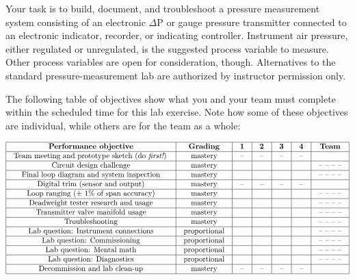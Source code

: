 \documentclass[12pt,a4paper]{article}
\begin{document}
\begin{itemize}
\vskip 5pt

Your task is to build, document, and troubleshoot a pressure measurement system consisting of an electronic $\Delta$P or gauge pressure transmitter connected to an electronic indicator, recorder, or indicating controller.  Instrument air pressure, either regulated or unregulated, is the suggested process variable to measure.  Other process variables are open for consideration, though.  Alternatives to the standard pressure-measurement lab are authorized by instructor permission only.

The following table of objectives show what you and your team must complete within the scheduled time for this lab exercise.  Note how some of these objectives are individual, while others are for the team as a whole:



$$\vbox{\offinterlineskip
\halign{\strut
\vrule \quad\hfil # \ \hfil & 
\vrule \quad\hfil # \ \hfil & 
\vrule \quad\hfil # \ \hfil & 
\vrule \quad\hfil # \ \hfil & 
\vrule \quad\hfil # \ \hfil & 
\vrule \quad\hfil # \ \hfil & 
\vrule \quad\hfil # \ \hfil \vrule \cr
\noalign{\hrule}
%
{\bf Performance objective} & {\bf Grading} & {\bf 1} & {\bf 2} & {\bf 3} & {\bf 4} & {\bf Team} \cr
%
\noalign{\hrule}
%
Team meeting and prototype sketch (do {\it first!}) & mastery & -- & -- & -- & -- & \cr
%
\noalign{\hrule}
%
Circuit design challenge & mastery & & & & & -- -- -- -- \cr
%
\noalign{\hrule}
%
Final loop diagram and system inspection & mastery & & & & & -- -- -- -- \cr
%
\noalign{\hrule}
%
Digital trim (sensor and output) & mastery & -- & -- & -- & -- &  \cr
%
\noalign{\hrule}
%
Loop ranging ($\pm$ 1\% of span accuracy) & mastery & & & & & -- -- -- -- \cr
%
\noalign{\hrule}
%
Deadweight tester research and usage & mastery & & & & & -- -- -- -- \cr
%
\noalign{\hrule}
%
Transmitter valve manifold usage & mastery & & & & & -- -- -- -- \cr
%
\noalign{\hrule}
%
Troubleshooting & mastery & & & & & -- -- -- -- \cr
%
\noalign{\hrule}
%
Lab question: Instrument connections & proportional &  &  &  &  & -- -- -- -- \cr
%
\noalign{\hrule}
%
Lab question: Commissioning & proportional &  &  &  &  & -- -- -- -- \cr
%
\noalign{\hrule}
%
Lab question: Mental math & proportional &  &  &  &  & -- -- -- -- \cr
%
\noalign{\hrule}
%
Lab question: Diagnostics & proportional &  &  &  &  & -- -- -- -- \cr
%
\noalign{\hrule}
%
Decommission and lab clean-up & mastery & -- & -- & -- & -- &  \cr
%
\noalign{\hrule}
} %
}$$ %


\end{itemize}
\end{document}
